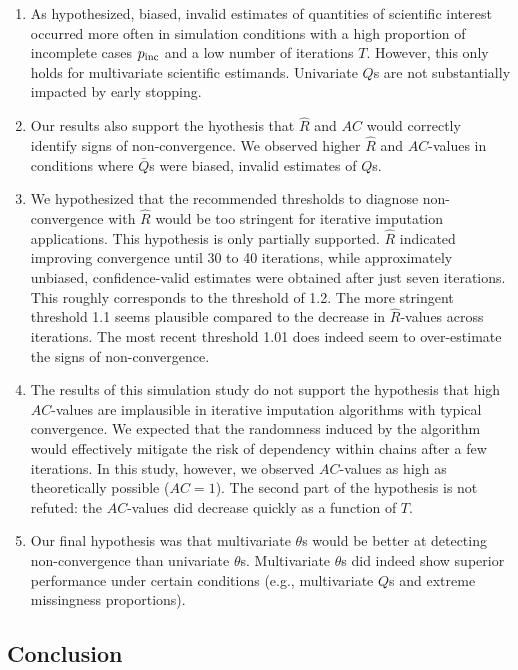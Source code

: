 \documentclass[Royal,times,sageh]{sagej}
\begin{document}
\begin{enumerate}
\def\labelenumi{\arabic{enumi}.}
\item
  As hypothesized, biased, invalid estimates of quantities of scientific interest occurred more often in simulation conditions with a high proportion of incomplete cases \(p_{\rm inc}\) and a low number of iterations \(T\). However, this only holds for multivariate scientific estimands. Univariate \(Q\)s are not substantially impacted by early stopping.
\item
  Our results also support the hyothesis that \(\widehat{R}\) and \(AC\) would correctly identify signs of non-convergence. We observed higher \(\widehat{R}\) and \(AC\)-values in conditions where \(\bar{Q}\)s were biased, invalid estimates of \(Q\)s.
\item
  We hypothesized that the recommended thresholds to diagnose non-convergence with \(\widehat{R}\) would be too stringent for iterative imputation applications. This hypothesis is only partially supported. \(\widehat{R}\) indicated improving convergence until 30 to 40 iterations, while approximately unbiased, confidence-valid estimates were obtained after just seven iterations. This roughly corresponds to the threshold of 1.2. The more stringent threshold 1.1 seems plausible compared to the decrease in \(\widehat{R}\)-values across iterations. The most recent threshold 1.01 does indeed seem to over-estimate the signs of non-convergence.
\item
  The results of this simulation study do not support the hypothesis that high \(AC\)-values are implausible in iterative imputation algorithms with typical convergence. We expected that the randomness induced by the algorithm would effectively mitigate the risk of dependency within chains after a few iterations. In this study, however, we observed \(AC\)-values as high as theoretically possible (\(AC=1\)). The second part of the hypothesis is not refuted: the \(AC\)-values did decrease quickly as a function of \(T\).
\item
  Our final hypothesis was that multivariate \(\theta\)s would be better at detecting non-convergence than univariate \(\theta\)s. Multivariate \(\theta\)s did indeed show superior performance under certain conditions (e.g., multivariate \(Q\)s and extreme missingness proportions).
\end{enumerate}

\hypertarget{conclusion}{%
\subsection{Conclusion}\label{conclusion}}
\end{document}
